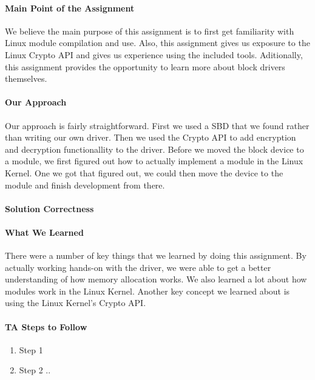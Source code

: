 \documentclass[titlepage,draftclsnofoot,onecolumn]{article}
\begin{document}
\paragraph{Main Point of the Assignment}
We believe the main purpose of this assignment is to first get familiarity with Linux module compilation and use. Also, this assignment gives us exposure to the Linux Crypto API and gives us experience using the included tools. Aditionally, this assignment provides the opportunity to learn more about block drivers themselves.

\paragraph{Our Approach}
Our approach is fairly straightforward. First we used a SBD that we found rather than writing our own driver. Then we used the Crypto API to add encryption and decryption functionallity to the driver. Before we moved the block device to a module, we first figured out how to actually implement a module in the Linux Kernel. One we got that figured out, we could then move the device to the module and finish development from there.

\paragraph{Solution Correctness}


\paragraph{What We Learned}
There were a number of key things that we learned by doing this assignment. By actually working hands-on with the driver, we were able to get a better understanding of how memory allocation works. We also learned a lot about how modules work in the Linux Kernel. Another key concept we learned about is using the Linux Kernel's Crypto API.

\paragraph{TA Steps to Follow}


\begin{enumerate}
  \item Step 1
  \item Step 2 ..
\end{enumerate}
\end{document}
